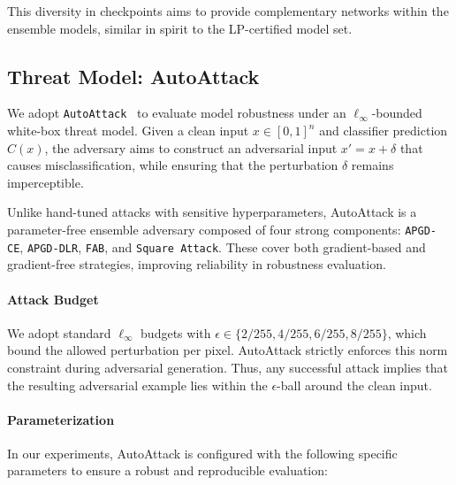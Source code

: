 This diversity in checkpoints aims to provide complementary networks within the ensemble models, similar in spirit to the LP-certified model set.

\subsection{Threat Model: AutoAttack}
\label{sec:threat model}
\indent

We adopt \texttt{AutoAttack}~\cite{croce2020reliable} to evaluate model robustness under an $\ell_\infty$-bounded white-box threat model. Given a clean input $x \in [0,1]^n$ and classifier prediction $C(x)$, the adversary aims to construct an adversarial input $x' = x + \delta$ that causes misclassification, while ensuring that the perturbation $\delta$ remains imperceptible.

Unlike hand-tuned attacks with sensitive hyperparameters, AutoAttack is a parameter-free ensemble adversary composed of four strong components: \texttt{APGD-CE}, \texttt{APGD-DLR}, \texttt{FAB}, and \texttt{Square Attack}. These cover both gradient-based and gradient-free strategies, improving reliability in robustness evaluation.

\paragraph{Attack Budget}

We adopt standard $\ell_\infty$ budgets with $\epsilon \in \{2/255, 4/255,6/255, 8/255\}$, which bound the allowed perturbation per pixel. AutoAttack strictly enforces this norm constraint during adversarial generation. Thus, any successful attack implies that the resulting adversarial example lies within the $\epsilon$-ball around the clean input.

\paragraph{Parameterization}

In our experiments, AutoAttack is configured with the following specific parameters to ensure a robust and reproducible evaluation:

